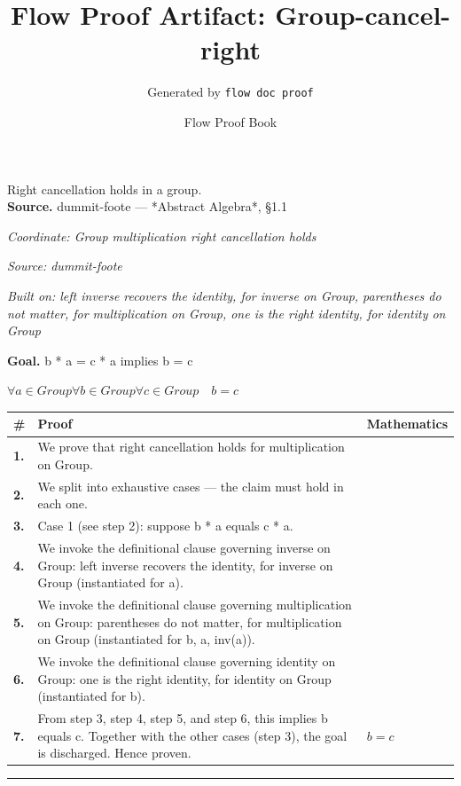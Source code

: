 \documentclass[11pt]{article}
\title{Flow Proof Artifact: Group-cancel-right}
\author{Generated by \texttt{flow doc proof}}
\date{Flow Proof Book}
\theoremstyle{definition}
\begin{document}
\maketitle
Right cancellation holds in a group.\\[0.5em]
\textbf{Source.} dummit-foote — *Abstract Algebra*, §1.1\\[0.5em]
\bigskip
{}\par
\smallskip\noindent\textit{Coordinate: Group \cdot multiplication \cdot right cancellation holds}\par
\smallskip\noindent\textit{Source: dummit-foote}\par
\smallskip\noindent\textit{Built on: left inverse recovers the identity, for inverse on Group, parentheses do not matter, for multiplication on Group, one is the right identity, for identity on Group}\par
\medskip
\noindent\textbf{Goal.} b * a = c * a implies b = c\par
\noindent$\displaystyle \forall a \in Group \forall b \in Group \forall c \in Group\quad b = c$\par
\medskip
\noindent
\begin{tabular}{@{} >{\raggedright\arraybackslash}p{} >{\raggedright\arraybackslash}p{} >{\raggedleft\arraybackslash}p{} @{}}
\textbf{\#} & \textbf{Proof} & \textbf{Mathematics} \\
\midrule
\textbf{1.} & We prove that right cancellation holds for multiplication on Group. & \\[0.45em]
\textbf{2.} & We split into exhaustive cases — the claim must hold in each one. & \\[0.45em]
\textbf{3.} & Case 1 (see step 2): suppose b * a  equals  c * a. & \\[0.45em]
\textbf{4.} & We invoke the definitional clause governing inverse on Group: left inverse recovers the identity, for inverse on Group (instantiated for a). & \\[0.45em]
\textbf{5.} & We invoke the definitional clause governing multiplication on Group: parentheses do not matter, for multiplication on Group (instantiated for b, a, inv(a)). & \\[0.45em]
\textbf{6.} & We invoke the definitional clause governing identity on Group: one is the right identity, for identity on Group (instantiated for b). & \\[0.45em]
\textbf{7.} & From step 3, step 4, step 5, and step 6, this implies b equals c. Together with the other cases (step 3), the goal is discharged. Hence proven. & $\displaystyle b = c$ \\[0.45em]
\bottomrule
\end{tabular}
\label{thm:Group-multiplication-right_cancellation_holds}
\par\medskip\hrule
\end{document}
